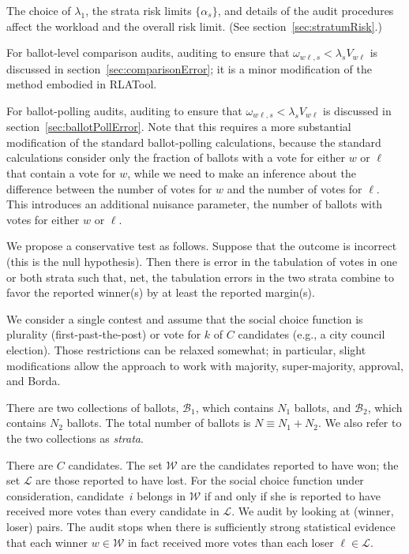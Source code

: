 \documentclass[12pt]{article}
\newcommand{\mc}[1]{\ensuremath{\mathcal{#1}}}
\begin{document}
The choice of $\lambda_1$, the strata risk limits $\{\alpha_s\}$, and details of the
audit procedures affect the workload and the overall risk limit.
(See section~\ref{sec:stratumRisk}.)

For ballot-level comparison audits, auditing to ensure that $\omega_{w\ell,s} < \lambda_s V_{w\ell}$
is discussed in section~\ref{sec:comparisonError}; it is a minor modification of the method
embodied in RLATool.

For ballot-polling audits, auditing to ensure that $\omega_{w\ell,s} < \lambda_s V_{w\ell}$ is discussed in section~\ref{sec:ballotPollError}.
Note that this requires a more substantial modification of the standard ballot-polling calculations,
because the standard calculations consider only the fraction of ballots with a vote for either 
$w$ or $\ell$ that contain a vote for $w$, while we need to make an inference about the 
difference between the number of votes for $w$ and the number of votes for $\ell$.
This introduces an additional nuisance parameter, the number of ballots with votes for either
$w$ or $\ell$.







We propose a conservative test as follows. 
Suppose that the outcome is incorrect (this is the null hypothesis).
Then there is error in the tabulation of votes in one or both strata such that, net,
the tabulation errors in the two strata combine to favor the reported winner(s)
by at least the reported margin(s).

We consider a single contest and assume that the
social choice function is plurality (first-past-the-post)
or vote for $k$ of $C$ candidates (e.g., a city council election).
Those restrictions can be relaxed somewhat; in particular, slight modifications allow
the approach to work with majority, super-majority, approval, and Borda.

There are two collections of ballots, $\mc{B}_1$, which contains $N_1$ ballots, 
and $\mc{B}_2$, which contains $N_2$ ballots.
The total number of ballots is $N \equiv N_1 + N_2$.
We also refer to the two collections as \emph{strata}.

There are $C$ candidates.
The set $\mc{W}$ are the candidates reported to have won; the set $\mc{L}$ are those
reported to have lost.
For the social choice function under consideration, candidate~$i$ belongs in $\mc{W}$ if and
only if she is reported to have received more votes than every candidate in $\mc{L}$.
We audit by looking at (winner, loser) pairs.
The audit stops when there is sufficiently strong statistical evidence that each winner 
$w \in \mc{W}$ in fact received more votes
than each loser $\ell \in \mc{L}$.
\end{document}
